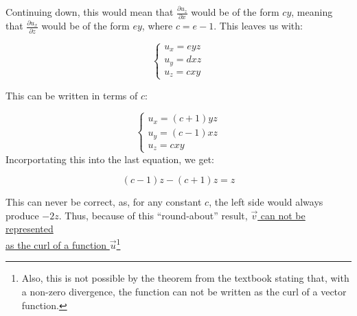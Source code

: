 \begin{enumerate}
\begin{enumerate}
\begin{enumerate}
              Continuing down, this would mean that $\frac{\partial u_z}{\partial x}$ would be of the form $cy$, meaning that $\frac{\partial u_x}{\partial z}$ would be of the form $ey$, where $c=e-1$. This leaves us with:

              $$\left\{\begin{array}{l} u_x=eyz\\u_y=dxz\\u_z=cxy\end{array}$$

                This can be written in terms of $c$:

                $$\left\{\begin{array}{l} u_x=(c+1)yz\\u_y=(c-1)xz\\u_z=cxy\end{array}$$
                  Incorportating this into the last equation, we get:

                  $$(c-1)z-(c+1)z=z$$

                  This can never be correct, as, for any constant $c$, the left side would always produce $-2z$. Thus, because of this ``round-about'' result, \underline{$\vec{v}$ can not be represented}\\\underline{ as the curl of a function $\vec{u}$}\footnote{Also, this is not possible by the theorem from the textbook stating that, with a non-zero divergence, the function can not be written as the curl of a vector function.} 

        \end{enumerate}

    \end{enumerate}

\end{enumerate}




